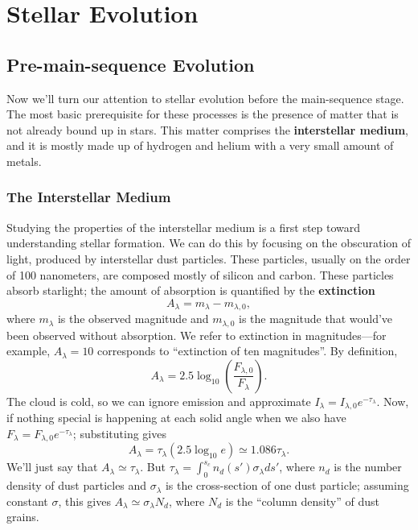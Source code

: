 \documentclass[../a062main.tex]{subfiles}
\begin{document}
\chapter{Stellar Evolution}
\section{Pre-main-sequence Evolution}
Now we'll turn our attention to stellar evolution before the main-sequence stage.
The most basic prerequisite for these processes is the presence of matter that is not already bound up in stars.
This matter comprises the \textbf{interstellar medium}, and it is mostly made up of hydrogen and helium with a very small amount of metals.

\subsection*{The Interstellar Medium}
Studying the properties of the interstellar medium is a first step toward understanding stellar formation.
We can do this by focusing on the obscuration of light, produced by interstellar dust particles.
These particles, usually on the order of 100 nanometers, are composed mostly of silicon and carbon.
These particles absorb starlight; the amount of absorption is quantified by the \textbf{extinction}
\[ A_\lambda = m_\lambda - m_{\lambda,0}, \]
where $m_\lambda$ is the observed magnitude and $m_{\lambda,0}$ is the magnitude that would've been observed without absorption.
We refer to extinction in magnitudes---for example, $A_\lambda = 10$ corresponds to ``extinction of ten magnitudes''.
By definition,
\[ A_\lambda = 2.5 \log_{10} \left( \frac{F_{\lambda,0}}{F_\lambda} \right). \]
The cloud is cold, so we can ignore emission and approximate $I_\lambda = I_{\lambda,0} e^{-\tau_\lambda}$.
Now, if nothing special is happening at each solid angle when we also have $F_\lambda = F_{\lambda,0} e^{-\tau_\lambda}$; substituting gives
\[ A_\lambda = \tau_\lambda (2.5 \log_{10} e) \simeq 1.086\tau_\lambda. \]
We'll just say that $A_\lambda \simeq \tau_\lambda$.
But $\tau_\lambda = \int_{0}^{s_c} n_d(s') \sigma_\lambda ds'$, where $n_d$ is the number density of dust particles and $\sigma_\lambda$ is the cross-section of one dust particle; assuming constant $\sigma$, this gives $A_\lambda \simeq \sigma_\lambda N_d$, where $N_d$ is the ``column density'' of dust grains.
\end{document}
